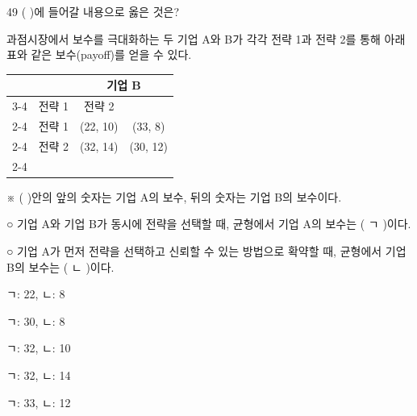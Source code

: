 \begin{question}{49}
( )에 들어갈 내용으로 옳은 것은?
\begin{framedtext}
과점시장에서 보수를 극대화하는 두 기업 A와 B가 각각 전략 1과 전략 2를 통해 아래 표와 같은 보수(payoff)를 얻을 수 있다. \par
{\small\centering\begin{tabular}{cc|c|c|}
\multicolumn{2}{c}{} & \multicolumn{2}{c}{기업 B} \\ \cline{3-4}
\multicolumn{2}{c|}{} & 전략 1 & 전략 2 \\ \cline{2-4}
\multirow{2}{*}{기업 A} & 전략 1 & (22, 10) & (33, 8) \\ \cline{2-4}
 & 전략 2 & (32, 14) & (30, 12) \\ \cline{2-4}
\end{tabular}\par}
\hfill ※ ( )안의 앞의 숫자는 기업 A의 보수, 뒤의 숫자는 기업 B의 보수이다. \par
\smallskip
○ 기업 A와 기업 B가 동시에 전략을 선택할 때, 균형에서 기업 A의 보수는 ( ㄱ )이다. \par
○ 기업 A가 먼저 전략을 선택하고 신뢰할 수 있는 방법으로 확약할 때, 균형에서 기업 B의 보수는 ( ㄴ )이다.
\end{framedtext}
\begin{choices}
  \item ㄱ: 22, ㄴ: 8
  \item ㄱ: 30, ㄴ: 8
  \item ㄱ: 32, ㄴ: 10
  \item ㄱ: 32, ㄴ: 14
  \item ㄱ: 33, ㄴ: 12
\end{choices}
\end{question}
